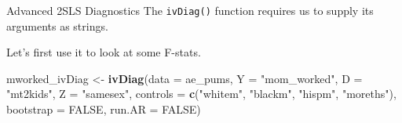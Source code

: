 \documentclass[
  ignorenonframetext,
]{beamer}
\newenvironment{Shaded}{\begin{snugshade}}{\end{snugshade}}
\newcommand{\AttributeTok}[1]{\textcolor[rgb]{0.13,0.29,0.53}{#1}}
\newcommand{\ConstantTok}[1]{\textcolor[rgb]{0.56,0.35,0.01}{#1}}
\newcommand{\FunctionTok}[1]{\textcolor[rgb]{0.13,0.29,0.53}{\textbf{#1}}}
\newcommand{\NormalTok}[1]{#1}
\newcommand{\OtherTok}[1]{\textcolor[rgb]{0.56,0.35,0.01}{#1}}
\newcommand{\StringTok}[1]{\textcolor[rgb]{0.31,0.60,0.02}{#1}}
\begin{document}
\begin{frame}[fragile]{Advanced 2SLS Diagnostics}
\label{advanced-2sls-diagnostics-1}
The \texttt{ivDiag()} function requires us to supply its arguments as
strings.

Let's first use it to look at some F-stats.

\scriptsize

\begin{Shaded}
\begin{Highlighting}[]
\NormalTok{mworked\_ivDiag }\OtherTok{\textless{}{-}} \FunctionTok{ivDiag}\NormalTok{(}\AttributeTok{data =}\NormalTok{ ae\_pums,}
                         \AttributeTok{Y =} \StringTok{"mom\_worked"}\NormalTok{,}
                         \AttributeTok{D =} \StringTok{"mt2kids"}\NormalTok{,}
                         \AttributeTok{Z =} \StringTok{"samesex"}\NormalTok{,}
                         \AttributeTok{controls =} \FunctionTok{c}\NormalTok{(}\StringTok{"whitem"}\NormalTok{, }\StringTok{"blackm"}\NormalTok{, }\StringTok{"hispm"}\NormalTok{, }\StringTok{"moreths"}\NormalTok{),}
                         \AttributeTok{bootstrap =} \ConstantTok{FALSE}\NormalTok{,}
                         \AttributeTok{run.AR =} \ConstantTok{FALSE}\NormalTok{)}
\end{Highlighting}
\end{Shaded}
\end{frame}
\end{document}
